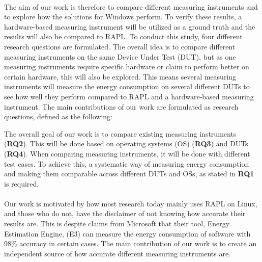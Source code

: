 \paragraph*{}
The aim of our work is therefore to compare different measuring instruments and to explore how the solutions for Windows perform. To verify these results, a hardware-based measuring instrument will be utilized as a ground truth and the results will also be compared to RAPL. To conduct this study, four different research questions are formulated. The overall idea is to compare different measuring instruments on the same Device Under Test (DUT), but as one measuring instruments require specific hardware or claim to perform better on certain hardware, this will also be explored. This means several measuring instruments will measure the energy consumption on several different DUTs to see how well they perform compared to RAPL and a hardware-based measuring instrument. The main contributions of our work are formulated as research questions, defined as the following:



The overall goal of our work is to compare existing measuring instruments (\textbf{RQ2}). This will be done based on operating systems (OS) (\textbf{RQ3}) and DUTs (\textbf{RQ4}). When comparing measuring instruments, it will be done with different test cases. To achieve this, a systematic way of measuring energy consumption and making them comparable across different DUTs and OSs, as stated in \textbf{RQ1} is required.

\paragraph*{}
Our work is motivated by how most research today mainly uses RAPL on Linux\cite[]{Rasmussen2021,Pereira2017,Theilmann2022,Lindholt2022}, and those who do not, have the disclaimer of not knowing how accurate their results are\cite[]{Bruce2015ReducingEC, Ozturk2019, Unlu2021}. This is despite claims from Microsoft that their tool, Energy Estimation Engine, (E3) can measure the energy consumption of software with 98\% accuracy in certain cases\cite[]{E3WinHec}. The main contribution of our work is to create an independent source of how accurate different measuring instruments are.

